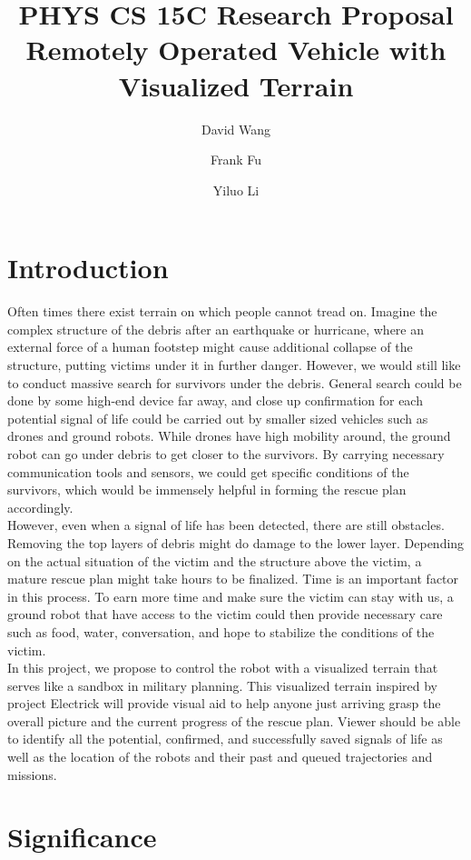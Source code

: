 \documentclass[a4paper,12pt]{article}
\title{\Titlefont PHYS CS 15C Research Proposal\\Remotely Operated Vehicle with Visualized Terrain}
\author[1]{\Authfont David Wang}
\author[1]{\Authfont Frank Fu}
\author[1]{\Authfont Yiluo Li}
\affil[1]{\Affilfont College of Creative Studies, University of California, Santa Barbara}
\begin{document}
\maketitle

\section{Introduction}
Often times there exist terrain on which people cannot tread on. Imagine the complex structure of the debris after an earthquake or hurricane, where an external force of a human footstep might cause additional collapse of the structure, putting victims under it in further danger. However, we would still like to conduct massive search for survivors under the debris. General search could be done by some high-end device far away, and close up confirmation for each potential signal of life could be carried out by smaller sized vehicles such as drones and ground robots. While drones have high mobility around, the ground robot can go under debris to get closer to the survivors. By carrying necessary communication tools and sensors, we could get specific conditions of the survivors, which would be immensely helpful in forming the rescue plan accordingly.
\\\indent However, even when a signal of life has been detected, there are still obstacles. Removing the top layers of debris might do damage to the lower layer. Depending on the actual situation of the victim and the structure above the victim, a mature rescue plan might take hours to be finalized. Time is an important factor in this process. To earn more time and make sure the victim can stay with us, a ground robot that have access to the victim could then provide necessary care such as food, water, conversation, and hope to stabilize the conditions of the victim.
\\\indent In this project, we propose to control the robot with a visualized terrain that serves like a sandbox in military planning. This visualized terrain inspired by project Electrick \cite{Zhang2017} will provide visual aid to help anyone just arriving grasp the overall picture and the current progress of the rescue plan. Viewer should be able to identify all the potential, confirmed, and successfully saved signals of life as well as the location of the robots and their past and queued trajectories and missions.


\section{Significance}
\end{document}
